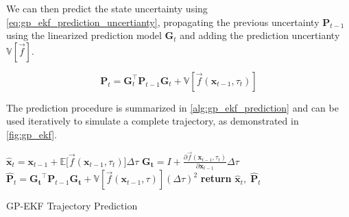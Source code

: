 We can then predict the state uncertainty using \cref{eq:gp_ekf_prediction_uncertianty}, propagating the previous uncertainty $\boldsymbol{P}_{t-1}$ using the linearized prediction model $\boldsymbol{G}_t$ and adding the prediction uncertianty $\mathbb{V}[\vec{f}]$.

\begin{equation}\label{eq:gp_ekf_prediction_uncertianty}
    \boldsymbol{P}_t = \boldsymbol{G}_t^\intercal \boldsymbol{P}_{t-1} \boldsymbol{G}_t + \mathbb{V}[\vec{f}(\boldsymbol{x}_{t-1}, \tau_t)]
\end{equation}

The prediction procedure is summarized in \cref{alg:gp_ekf_prediction} and can be used iteratively to simulate a complete trajectory, as demonstrated in \cref{fig:gp_ekf}.

\begin{algorithm}[h]
    \begin{algorithmic}[1]
        \State $\hat{\boldsymbol{x}}_{t} = \boldsymbol{x}_{t-1} + \mathbb{E}\big[\vec{f}(\boldsymbol{x}_{t-1}, \tau_t)\big] \Delta \tau$
        \State $\boldsymbol{G_t} = I + \frac{\partial \vec{f}(\boldsymbol{x}_{t-1}, \tau_t)}{\partial \boldsymbol{x}_{t-1}} \Delta \tau$
        \State $\hat{\boldsymbol{P}}_t = \boldsymbol{G_t}^\intercal \boldsymbol{P}_{t-1} \boldsymbol{G_t} +\mathbb{V}[\vec{f}(\boldsymbol{x}_{t-1}, \tau)] (\Delta \tau)^2$
        \State \textbf{return} $\hat{\boldsymbol{x}}_t, \; \hat{\boldsymbol{P}}_t$
        \EndProcedure
    \end{algorithmic}
    \caption{GP-EKF Trajectory Prediction}
    \label{alg:gp_ekf_prediction}
\end{algorithm}

